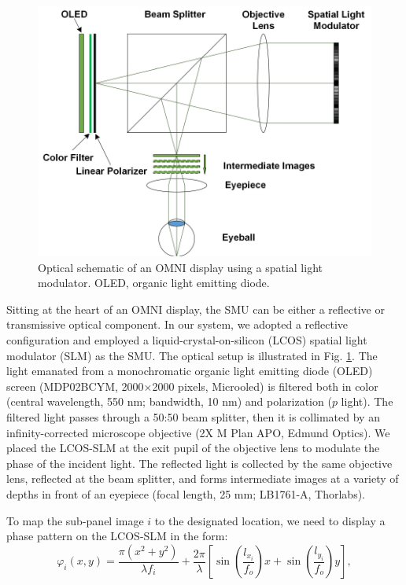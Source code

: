 \documentclass[9pt,twocolumn,twoside]{osajnl}
\begin{document}
\begin{figure}[htbp]
	\centering
	\includegraphics[width=\linewidth]{OMNIfig2}
	\caption{Optical schematic of an OMNI display using a spatial light modulator. OLED, organic light emitting diode.}
	\label{fig:2}
\end{figure}
Sitting at the heart of an OMNI display, the SMU can be either a reflective or transmissive optical component. In our system, we adopted a reflective configuration and employed a liquid-crystal-on-silicon (LCOS) spatial light modulator (SLM) as the SMU. The optical setup is illustrated in Fig. \ref{fig:2}. The light emanated from a monochromatic organic light emitting diode (OLED) screen (MDP02BCYM, 2000$\times$2000 pixels, Microoled) is filtered both in color (central wavelength, 550 nm; bandwidth, 10 nm) and polarization ($p$ light). The filtered light passes through a 50:50 beam splitter, then it is collimated by an infinity-corrected microscope objective (2X M Plan APO, Edmund Optics). We placed the LCOS-SLM at the exit pupil of the objective lens to modulate the phase of the incident light. The reflected light is collected by the same objective lens, reflected at the beam splitter, and forms intermediate images at a variety of depths in front of an eyepiece (focal length, 25 mm; LB1761-A, Thorlabs).\par
To map the sub-panel image $i$ to the designated location, we need to display a phase pattern on the LCOS-SLM in the form:
\begin{equation}
\varphi_{i}(x,y)=\frac{\pi (x^{2}+y^{2})}{\lambda f_{i}} + \frac{2 \pi}{\lambda}\left[\sin\left(\frac{l_{x_i}}{f_{o}}\right)x +\sin\left(\frac{l_{y_i}}{f_{o}}\right)y\right],
\label{eq:1}
\end{equation}
\end{document}
